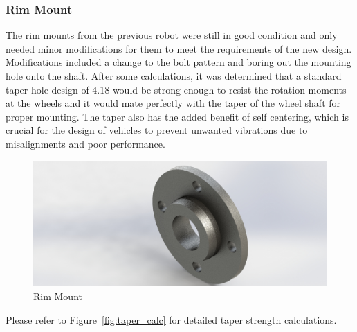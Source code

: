 \subsubsection{Rim Mount}
The rim mounts from the previous robot were still in good condition and only needed minor modifications for them to meet the requirements of the new design. Modifications included a change to the bolt pattern and boring out the mounting hole onto the shaft. After some calculations, it was determined that a standard taper hole design of 4.18\degree\,\,would be strong enough to resist the rotation moments at the wheels and it would mate perfectly with the taper of the wheel shaft for proper mounting. The taper also has the added benefit of self centering, which is crucial for the design of vehicles to prevent unwanted vibrations due to misalignments and poor performance.
\begin{figure}[H]
	\centering
	\includegraphics[width=.7\linewidth]{dom/rim_mount_iso_rndr.jpg}
	\caption{Rim Mount}
	\label{fig:rim_mount}
\end{figure}
Please refer to Figure~\ref{fig:taper_calc} for detailed taper strength calculations.
